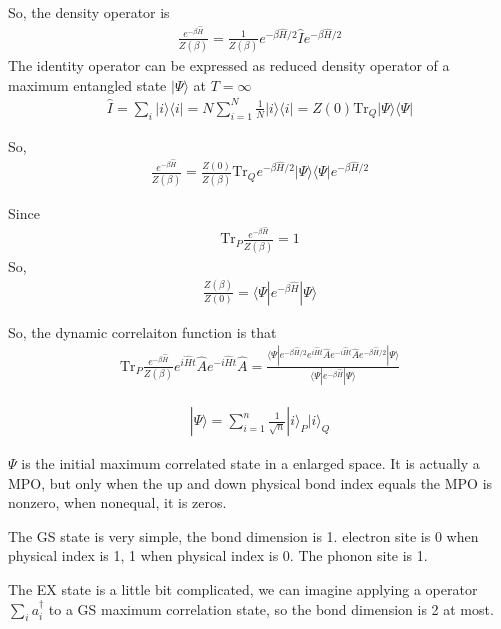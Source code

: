 \documentclass[a4paper,11pt]{ctexart}
\begin{document}
So, the density operator is 
\begin{gather}
    \frac{e^{-\beta \hat{H}}}{Z(\beta)} = \frac{1}{Z(\beta)} e^{-\beta
    \hat{H}/2} \hat{I}  e^{-\beta \hat{H}/2}
\end{gather}
The identity operator can be expressed as reduced density
operator of a maximum entangled state $| \Psi \rangle$ at $T=\infty$
\begin{gather}
    \hat{I} = \sum_i | i \rangle \langle i | = N \sum_{i=1}^N  \frac{1}{N} | i
    \rangle \langle i | = Z(0) \textrm{Tr}_Q | \Psi \rangle \langle \Psi |
\end{gather}

So, 
\begin{gather}
    \frac{e^{-\beta \hat{H}}}{Z(\beta)} = \frac{Z(0)}{Z(\beta)} \textrm{Tr}_Q
    e^{-\beta \hat{H}/2}| \Psi \rangle \langle \Psi |e^{-\beta \hat{H}/2} 
\end{gather}

Since
\begin{gather}
    \textrm{Tr}_P\frac{e^{-\beta \hat{H}}}{Z(\beta)} = 1
\end{gather}
So, 
\begin{gather}
    \frac{Z(\beta)}{Z(0)} = \langle \Psi | e^{-\beta \hat{H}} | \Psi
    \rangle  
\end{gather}

So, the dynamic correlaiton function is that
\begin{gather}
    \textrm{Tr}_P \frac{e^{-\beta \hat{H}}}{Z(\beta)} e^{i\hat{H}t} \hat{A}
    e^{-i\hat{H}t} \hat{A} =  \frac{
    \langle \Psi | e^{-\beta \hat{H} /2 } e^{i\hat{H}t} \hat{A} e^{-i\hat{H}t}
    \hat{A}
   e^{-\beta \hat{H} /2 } | \Psi \rangle  }{\langle \Psi | e^{-\beta \hat{H}} | \Psi \rangle}
\end{gather}

\begin{gather}
    | \Psi \rangle = \sum_{i=1}^n \frac{1}{\sqrt{n}} |i\rangle_P |i\rangle_Q
\end{gather}

$\Psi$ is the initial maximum correlated state in a enlarged space. It is
actually a MPO, but only when the up and down physical bond index equals the MPO
is nonzero, when nonequal, it is zeros.

The GS state is very simple, the bond dimension is 1. electron site is 0 when
physical index is 1, 1 when physical index is 0. The phonon site is 1.

The EX state is a little bit complicated, we can imagine applying a operator
$\sum_i a^\dagger_i$ to a GS maximum correlation state, so the bond dimension is
2 at most.
\end{document}
